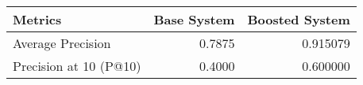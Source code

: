 \begin{tabular}{lrr}
\toprule
               Metrics &  Base System &  Boosted System \\
\midrule
     Average Precision &       0.7875 &        0.915079 \\
Precision at 10 (P@10) &       0.4000 &        0.600000 \\
\bottomrule
\end{tabular}
